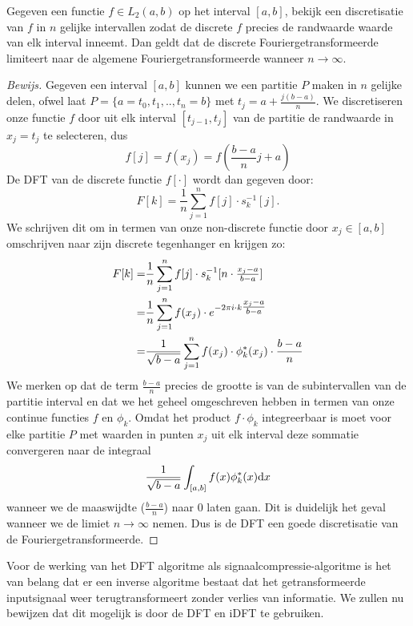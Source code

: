 \begin{stelling}
  Gegeven een functie $f\in L_2(a,b)$ op het interval $[a,b]$,
  bekijk een discretisatie van $f$ in $n$ gelijke intervallen zodat de discrete $f$ precies 
  de randwaarde waarde van elk interval inneemt.
  Dan geldt dat de discrete Fouriergetransformeerde limiteert naar de algemene Fouriergetransformeerde wanneer $n\to\infty$.
\end{stelling} 
\begin{proof}[Bewijs]
Gegeven een interval $[a,b]$ kunnen we een partitie $P$ maken in $n$ gelijke delen, 
ofwel laat $P=\{a=t_0,t_1,..,t_n=b\}$ met $t_j = a+\tfrac{j(b-a)}{n}$.
We discretiseren onze functie $f$ door uit elk interval $[t_{j-1},t_{j}]$ van de partitie de randwaarde in 
$x_j = t_j$ te selecteren, dus
\[
f[j] = f(x_j) = f(\frac{b-a}{n}j + a)
\]
De DFT van de discrete functie $f[\cdot]$ wordt dan gegeven door:
\[
F[k] = \frac1n\sum_{j=1}^n f[j] \cdot s_k^{-1}[j].
\]
We schrijven dit om in termen van onze non-discrete functie door $x_j\in[a,b]$ 
omschrijven naar zijn discrete tegenhanger en krijgen zo:
\begin{eqnarray*}
  F[k] =& \frac{1}{n} \sum_{j=1}^n f[j]\cdot s_k^{-1}[n\cdot\tfrac{x_j-a}{b-a}] \\
       =& \frac{1}{n} \sum_{j=1}^n f(x_j)\cdot e^{-{2\pi i} \cdot k \tfrac{x_j-a}{b-a}}\\
       =&  \frac{1}{\sqrt{b-a}}\sum_{j=1}^n f(x_j)\cdot \phi^*_k(x_j) \cdot\frac{b-a}{n} 
\end{eqnarray*}
We merken op dat de term $\frac{b-a}{n}$ precies de grootte is van de subintervallen van de partitie interval 
en dat we het geheel omgeschreven hebben in termen van onze continue functies $f$ en $\phi_k$.
Omdat het product $f\cdot\phi_k$ integreerbaar is moet voor elke partitie $P$ met 
waarden in punten $x_j$ uit elk interval deze sommatie convergeren naar de integraal
\[
  \frac{1}{\sqrt{b-a}} \int_{[a,b]} f(x) \phi^*_k(x) {\mathrm{d} x}
\]
wanneer we de maaswijdte ($\tfrac{b-a}{n}$) naar $0$ laten gaan. 
Dit is duidelijk het geval wanneer we de limiet $n\to\infty$ nemen. 
Dus is de DFT een goede discretisatie van de Fouriergetransformeerde. 
\end{proof}
 
Voor de werking van het DFT algoritme als signaalcompressie-algoritme is het van belang dat er een 
inverse algoritme bestaat dat het getransformeerde inputsignaal weer terugtransformeert 
zonder verlies van informatie. We zullen nu bewijzen dat dit mogelijk is door de DFT en iDFT te gebruiken.

